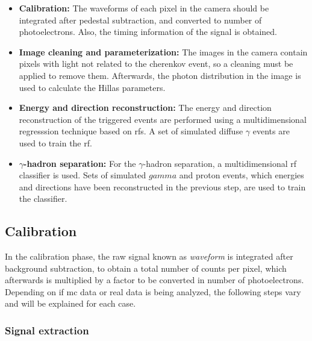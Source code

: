 \documentclass[main.tex]{subfiles}
\begin{document}
\begin{itemize}
\item\textbf{Calibration:} The waveforms of each pixel in the camera should be integrated after pedestal subtraction, and converted to number of photoelectrons. Also, the timing information of the signal is obtained. 
\item\textbf{Image cleaning and parameterization:} The images in the camera contain pixels with light not related to the cherenkov event, so a cleaning must be applied to remove them. Afterwards, the photon distribution in the image is used to calculate the Hillas parameters.
\item\textbf{Energy and direction reconstruction:} The energy and direction reconstruction of the triggered events are performed using a multidimensional regresssion technique based on \glspl{rf}. A set of simulated diffuse $\gamma$ events are used to train the \gls{rf}. 
\item\textbf{$\gamma$-hadron separation:} For the $\gamma$-hadron separation, a multidimensional \gls{rf} classifier is used. Sets of simulated $gamma$ and proton events, which energies and directions have been reconstructed in the previous step, are used to train the classifier.
\end{itemize}

\subsection{Calibration}

In the calibration phase, the raw signal known as \textit{waveform} is integrated after background subtraction, to obtain a total number of counts per pixel, which afterwards is multiplied by a factor to be converted in number of photoelectrons. Depending on if \gls{mc} data or real data is being analyzed, the following steps vary and will be explained for each case.

\subsubsection{Signal extraction} \label{sec:signalext}
\end{document}
